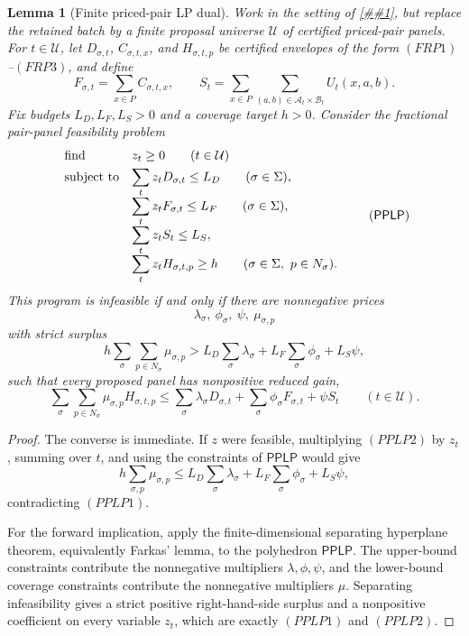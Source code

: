 \documentclass[10pt]{article}
\newcommand{\cref}[1]{\ref{##1}}
\newtheorem{lemma}[theorem]{Lemma}
\theoremstyle{definition}
\begin{document}
\begin{lemma}[Finite priced-pair LP dual]
   \label{lem:finite-priced-pair-lp-dual}
   Work in the setting of \cref{prop:finite-retained-priced-pair}, but replace
   the retained batch by a finite proposal universe \(\mathcal U\) of
   certified priced-pair panels.  For \(t\in\mathcal U\), let
   \(D_{\sigma,t}\), \(C_{\sigma,t,x}\), and \(H_{\sigma,t,p}\) be certified
   envelopes of the form \((FRP1)\)--\((FRP3)\), and define
   \[
      F_{\sigma,t}=\sum_{x\in P}C_{\sigma,t,x},
      \qquad
      S_t=
      \sum_{x\in P}
      \sum_{(a,b)\in\mathcal A_t\times\mathcal B_t}U_t(x,a,b).
   \]
   Fix budgets \(L_D,L_F,L_S>0\) and a coverage target \(h>0\).  Consider the
   fractional pair-panel feasibility problem
   \[
   \begin{array}{ll}
   \text{\rm find} & z_t\ge0\qquad(t\in\mathcal U)\\[0.3em]
   \text{\rm subject to}
      & \displaystyle \sum_tz_tD_{\sigma,t}\le L_D
        \qquad(\sigma\in\Sigma),\\[0.8em]
      & \displaystyle \sum_tz_tF_{\sigma,t}\le L_F
        \qquad(\sigma\in\Sigma),\\[0.8em]
      & \displaystyle \sum_tz_tS_t\le L_S,\\[0.8em]
      & \displaystyle \sum_tz_tH_{\sigma,t,p}\ge h
        \qquad(\sigma\in\Sigma,\ p\in N_\sigma).
   \end{array}
   \tag{\(\mathsf{PPLP}\)}
   \]
   This program is infeasible if and only if there are nonnegative prices
   \[
      \lambda_\sigma,\ \phi_\sigma,\ \psi,\ \mu_{\sigma,p}
   \]
   with strict surplus
   \[
      h\sum_{\sigma}\sum_{p\in N_\sigma}\mu_{\sigma,p}
      >
      L_D\sum_\sigma\lambda_\sigma
      +
      L_F\sum_\sigma\phi_\sigma
      +
      L_S\psi,
      \tag{PPLP1}
   \]
   such that every proposed panel has nonpositive reduced gain,
   \[
      \sum_\sigma\sum_{p\in N_\sigma}
      \mu_{\sigma,p}H_{\sigma,t,p}
      \le
      \sum_\sigma\lambda_\sigma D_{\sigma,t}
      +
      \sum_\sigma\phi_\sigma F_{\sigma,t}
      +
      \psi S_t
      \qquad(t\in\mathcal U).
      \tag{PPLP2}
   \]
\end{lemma}

\begin{proof}
   The converse is immediate.  If \(z\) were feasible, multiplying
   \((PPLP2)\) by \(z_t\), summing over \(t\), and using the constraints of
   \(\mathsf{PPLP}\) would give
   \[
      h\sum_{\sigma,p}\mu_{\sigma,p}
      \le
      L_D\sum_\sigma\lambda_\sigma
      +
      L_F\sum_\sigma\phi_\sigma
      +
      L_S\psi,
   \]
   contradicting \((PPLP1)\).

   For the forward implication, apply the finite-dimensional separating
   hyperplane theorem, equivalently Farkas' lemma, to the polyhedron
   \(\mathsf{PPLP}\).  The upper-bound constraints contribute the nonnegative
   multipliers \(\lambda,\phi,\psi\), and the lower-bound coverage constraints
   contribute the nonnegative multipliers \(\mu\).  Separating infeasibility
   gives a strict positive right-hand-side surplus and a nonpositive
   coefficient on every variable \(z_t\), which are exactly \((PPLP1)\) and
   \((PPLP2)\).
\end{proof}
\end{document}

